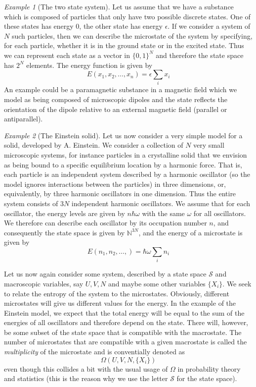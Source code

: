\documentclass[a4paper, draft]{article}
\theoremstyle{own}
\theoremstyle{remark}
\newtheorem{example}{Example}[section]
\newcommand{\N}{\mathbb{N}}
\begin{document}
\begin{example}[The two state system]
Let us assume that we have a substance which is composed of particles that only have two possible discrete states. One of these states has energy 0, the other state has energy $\epsilon$. If we consider a system of $N$ such particles, then we can describe the microstate of the system by specifying, for each particle, whether it is in the ground state or in the excited state. Thus we can represent each state as a vector in $\{0,1\}^N$ and therefore the state space has $2^N$ elements. The energy function is given by
$$
E(x_1, x_2, \dots, x_n) = \epsilon\sum_i x_i
$$
An example could be a paramagnetic substance in a magnetic field which we model as being composed of microscopic dipoles and the state reflects the orientation of the dipole relative to an external magnetic field (parallel or antiparallel).
\end{example}

\begin{example}[The Einstein solid]
Let us now consider a very simple model for a solid, developed by A. Einstein. We consider a collection of $N$ very small microscopic systems, for instance particles in a crystalline solid that we envision as being bound to a specific equilibrium location by a harmonic force. That is, each particle is an independent system described by a harmonic oscillator (so the model ignores interactions between the particles) in three dimensions, or, equivalently, by three harmonic oscillators in one dimension. Thus the entire system consists of $3N$ independent harmonic oscillators. We assume that for each oscillator, the energy levels are given by $n \hbar \omega$ with the same $\omega$ for all oscillators. We therefore can describe each oscillator by its occupation number $n$, and consequently the state space is given by ${\N}^{3N}$, and the energy of a microstate is given by
$$
E(n_1, n_2, \dots, ) = \hbar \omega \sum_i n_i
$$
\end{example}

Let us now again consider some system, described by a state space ${\mathcal S}$ and macroscopic variables, say $U, V, N$ and maybe some other variables $\{X_i \}$. We seek to relate the entropy of the system to the microstates. Obviously, different microstates will give us different values for the energy. In the example of the Einstein model, we expect that the total energy will be equal to the sum of the energies of all oscillators and therefore depend on the state. There will, however, be some subset of the state space that is compatible with the macrostate. The number of microstates that are compatible with a given macrostate is called the {\em multiplicity} of the microstate and is conventially denoted as
$$
\Omega(U,V,N, \{ X_i\})
$$
even though this collides a bit with the usual usage of $\Omega$ in probability theory and statistics (this is the reason why we use the letter ${\mathcal S}$ for the state space).
\end{document}
